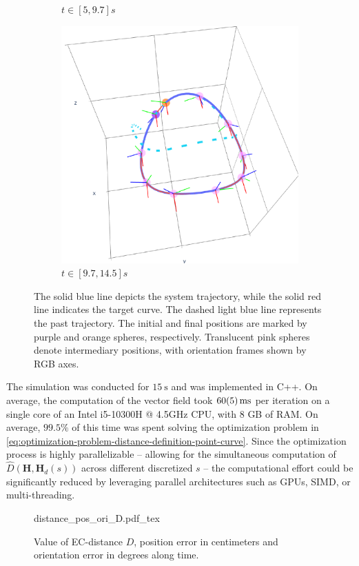 \begin{figure}[ht!]
\begin{subfigure}[b]{0.32\textwidth}
        \caption{$t\in[5, 9.7]s$}
        \label{fig:vfplot-second}
    \end{subfigure}
    \hfill
    \begin{subfigure}[b]{0.32\textwidth}
        \centering
        \includegraphics[width=\textwidth]{figures/vf_automatica_3.pdf} %
        \caption{$t\in[9.7, 14.5]s$}
        \label{fig:vfplot-third}
    \end{subfigure}
    \caption{The solid blue line depicts the system trajectory, while the solid red line indicates the target curve. The dashed light blue line represents the past trajectory. The initial and final positions are marked by purple and orange spheres, respectively. Translucent pink spheres denote intermediary positions, with orientation frames shown by RGB axes.}
    \label{fig:vfplot-trajectory}
\end{figure}
The simulation was conducted for $\qty{15}{\second}$ and was implemented in C++. On average, the computation of the vector field took $\qty{60 \pm 5}{\milli\second}$ per iteration on a single core of an Intel i5-10300H @ 4.5GHz CPU, with 8 GB of RAM. On average, $99.5\%$ of this time was spent solving the optimization problem in \eqref{eq:optimization-problem-distance-definition-point-curve}. Since the optimization process is highly parallelizable -- allowing for the simultaneous computation of $\widehat{D}(\mathbf{H},\mathbf{H}_d(s))$ across different discretized $s$ -- the computational effort could be significantly reduced by leveraging parallel architectures such as GPUs, SIMD, or multi-threading.
\begin{figure}[ht!]
    \centering
    \def\svgwidth{.8\linewidth}
    {\tiny{distance_pos_ori_D.pdf_tex}}
    \caption{Value of EC-distance $D$, position error in centimeters and orientation error in degrees along time.}
    \label{fig:position-orientation-errors}
\end{figure}

